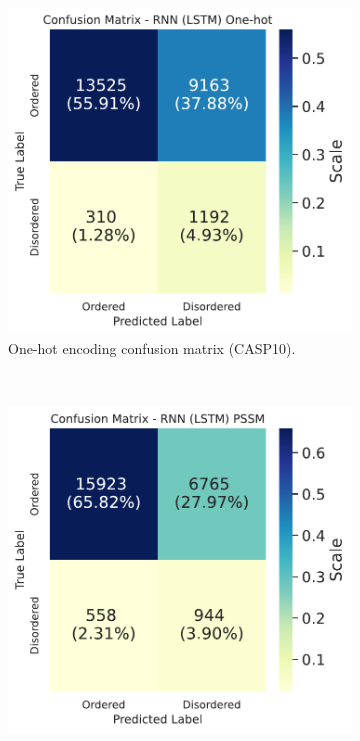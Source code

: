 \documentclass{l4proj}
\begin{document}
\begin{figure}[!htb] 
    \centering
    \begin{subfigure}[b]{0.48\textwidth}
        \includegraphics[width=\textwidth]{images/confmats/CASP10RNN1hot-cf.pdf}
        \caption{One-hot encoding confusion matrix (CASP10).}
        \label{fig:caspcfrnn1hot}
    \end{subfigure}
    ~
    \begin{subfigure}[b]{0.48\textwidth}
        \includegraphics[width=\textwidth]{images/confmats/CASP10RNNpssm-cf.pdf}

\end{subfigure}
\end{figure}
\end{document}
